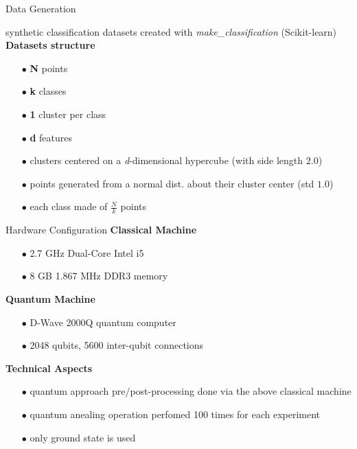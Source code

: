 		\begin{frame}{Data Generation}

			synthetic classification datasets created with \textit{make\_classification} (Scikit-learn)	\\
			\textbf{Datasets structure}
			\begin{itemize}
				\item[$\bullet$] \textbf{N} points	
				\item[$\bullet$] \textbf{k} classes	
				\item[$\bullet$] \textbf{1} cluster per class	
				\item[$\bullet$] \textbf{d} features 
				\item[$\bullet$] clusters centered on a \textit{d}-dimensional hypercube (with side length $2.0$)  
				\item[$\bullet$] points generated from a normal dist. about their cluster center (std $1.0$)   
				\item[$\bullet$] each class made of $\frac{N}{k}$ points   
			\end{itemize}
			
		\end{frame}

		\begin{frame}{Hardware Configuration}	
			\textbf{Classical Machine}
			\begin{itemize}
				\item[$\bullet$] 2.7 GHz Dual-Core Intel i5 
				\item[$\bullet$] 8 GB 1.867 MHz DDR3 memory 
			\end{itemize}

			\textbf{Quantum Machine}
			\begin{itemize}
				\item[$\bullet$] D-Wave 2000Q quantum computer 
				\item[$\bullet$] 2048 qubits, 5600 inter-qubit connections
			\end{itemize}

			\textbf{Technical Aspects}
			\begin{itemize}
				\item[$\bullet$] quantum approach pre/post-processing done via the above classical machine
				\item[$\bullet$] quantum anealing operation perfomed 100 times for each experiment   
				\item[$\bullet$] only ground state is used %
			\end{itemize}			
					
		\end{frame}


